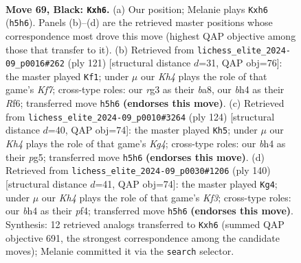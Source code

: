 \documentclass[11pt]{article}
\begin{document}
\begin{figure}[p]\centering
\begin{subfigure}{0.46\textwidth}\centering
\resizebox{\linewidth}{!}{%
\newchessgame
\chessboard[
  setfen={8/8/7R/7k/r5bB/6R1/2n2P2/7K b - - 0 69},
  showmover=false,
  pgfstyle=straightmove, color=movearrow, markmove={h5-h6}
]}
\caption{}
\end{subfigure}\hfill
\begin{subfigure}{0.46\textwidth}\centering
\resizebox{\linewidth}{!}{%
\newchessgame
\chessboard[
  setfen={B7/8/5r2/7K/8/4b3/5kR1/8 b - - 5 61},
  showmover=false,
  pgfstyle=straightmove, color=movearrow, markmove={f2-f1}
]}
\caption{}
\end{subfigure}
\\[4pt]
\begin{subfigure}{0.46\textwidth}\centering
\resizebox{\linewidth}{!}{%
\newchessgame
\chessboard[
  setfen={8/8/8/5Bp1/6K1/6r1/5k2/8 w - - 0 63},
  showmover=false,
  pgfstyle=straightmove, color=movearrow, markmove={g4-h5}
]}
\caption{}
\end{subfigure}\hfill
\begin{subfigure}{0.46\textwidth}\centering
\resizebox{\linewidth}{!}{%
\newchessgame
\chessboard[
  setfen={8/8/8/8/4Bp2/5K2/5r2/4k3 w - - 0 71},
  showmover=false,
  pgfstyle=straightmove, color=movearrow, markmove={f3-g4}
]}
\caption{}
\end{subfigure}
\caption{\textbf{Move 69, Black: \texttt{Kxh6}.} (a) Our position; Melanie plays \texttt{Kxh6} (\texttt{h5h6}). Panels (b)--(d) are the retrieved master positions whose correspondence most drove this move (highest QAP objective among those that transfer to it). (b) Retrieved from \texttt{lichess\_elite\_2024-09\_p0016\#262} (ply 121) [structural distance $d$=31, QAP obj=76]: the master played \texttt{Kf1}; under $\mu$ our \emph{Kh4} plays the role of that game's \emph{Kf7}; cross-type roles: our \emph{r}g3 as their \emph{b}a8, our \emph{b}h4 as their \emph{R}f6; transferred move \texttt{h5h6} \textbf{(endorses this move)}. (c) Retrieved from \texttt{lichess\_elite\_2024-09\_p0010\#3264} (ply 124) [structural distance $d$=40, QAP obj=74]: the master played \texttt{Kh5}; under $\mu$ our \emph{Kh4} plays the role of that game's \emph{Kg4}; cross-type roles: our \emph{b}h4 as their \emph{p}g5; transferred move \texttt{h5h6} \textbf{(endorses this move)}. (d) Retrieved from \texttt{lichess\_elite\_2024-09\_p0030\#1206} (ply 140) [structural distance $d$=41, QAP obj=74]: the master played \texttt{Kg4}; under $\mu$ our \emph{Kh4} plays the role of that game's \emph{Kf3}; cross-type roles: our \emph{b}h4 as their \emph{p}f4; transferred move \texttt{h5h6} \textbf{(endorses this move)}. Synthesis: 12 retrieved analogs transferred to \texttt{Kxh6} (summed QAP objective 691, the strongest correspondence among the candidate moves); Melanie committed it via the \texttt{search} selector.}
\label{fig:thought-m137}
\end{figure}
\end{document}
